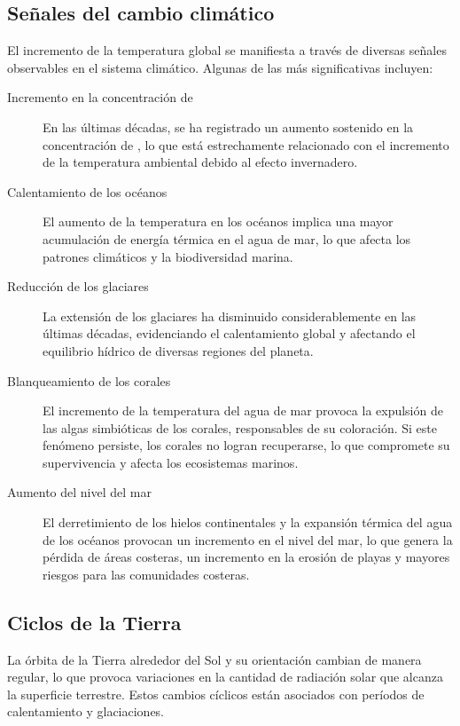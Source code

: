 \subsection{Señales del cambio climático}\label{senial}

El incremento de la temperatura global se manifiesta a través de diversas señales observables en el sistema climático. Algunas de las más significativas incluyen:

\begin{description}
    \item[Incremento en la concentración de ] En las últimas décadas, se ha registrado un aumento sostenido en la concentración de , lo que está estrechamente relacionado con el incremento de la temperatura ambiental debido al efecto invernadero.
    
    \item[Calentamiento de los océanos] El aumento de la temperatura en los océanos implica una mayor acumulación de energía térmica en el agua de mar, lo que afecta los patrones climáticos y la biodiversidad marina.
    
    \item[Reducción de los glaciares] La extensión de los glaciares ha disminuido considerablemente en las últimas décadas, evidenciando el calentamiento global y afectando el equilibrio hídrico de diversas regiones del planeta.
    
    \item[Blanqueamiento de los corales] El incremento de la temperatura del agua de mar provoca la expulsión de las algas simbióticas de los corales, responsables de su coloración. Si este fenómeno persiste, los corales no logran recuperarse, lo que compromete su supervivencia y afecta los ecosistemas marinos.
    
    \item[Aumento del nivel del mar] El derretimiento de los hielos continentales y la expansión térmica del agua de los océanos provocan un incremento en el nivel del mar, lo que genera la pérdida de áreas costeras, un incremento en la erosión de playas y mayores riesgos para las comunidades costeras.
\end{description}

\subsection{Ciclos de la Tierra}\label{ctierra}

La órbita de la Tierra alrededor del Sol y su orientación cambian de manera regular, lo que provoca variaciones en la cantidad de radiación solar que alcanza la superficie terrestre. Estos cambios cíclicos están asociados con períodos de calentamiento y glaciaciones. 

